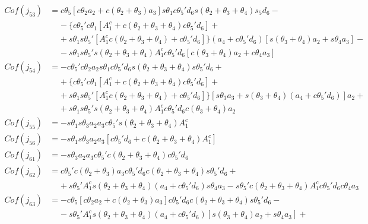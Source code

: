 \begin{align}
    Cof(j_{53}) &= c\theta_5[c\theta_2a_2+c(\theta_2+\theta_3)a_3]s\theta_1c\theta_5'd_6s(\theta_2+\theta_3+\theta_4)s_5d_6- \nonumber \\
                    & \;\;\;\; -\!\{c\theta_5'c\theta_1[A_1^c+c(\theta_2+\theta_3+\theta_4)c\theta_5'd_6]+\nonumber \\
                    & \;\;\;\; +\!s\theta_1s\theta_5'[A_1^cc(\theta_2+\theta_3+\theta_4)+c\theta_5'd_6]\}(a_4+c\theta_5'd_6)[s(\theta_3+\theta_4)a_2+s\theta_4a_3]-\nonumber \\
                    & \;\;\;\; -\!s\theta_1s\theta_5's(\theta_2+\theta_3+\theta_4)A_1^cc\theta_5'd_6[c(\theta_3+\theta_4)a_2+c\theta_4a_3] \nonumber \\        
    Cof(j_{54}) &= -c\theta_5'c\theta_2a_2s\theta_1c\theta_5'd_6s(\theta_2+\theta_3+\theta_4)s\theta_5'd_6+ \nonumber \\
                    & \;\;\;\; +\!\{c\theta_5'c\theta_1[A_1^c+c(\theta_2+\theta_3+\theta_4)c\theta_5'd_6]+\nonumber \\
                    & \;\;\;\; +\!s\theta_1s\theta_5'[A_1^cc(\theta_2+\theta_3+\theta_4)+c\theta_5'd_6]\}[s\theta_3a_3+s(\theta_3+\theta_4)(a_4+c\theta_5'd_6)]a_2+\nonumber \\
                    & \;\;\;\; +\!s\theta_1s\theta_5's(\theta_2+\theta_3+\theta_4)A_1^cc\theta_5'd_6c(\theta_3+\theta_4)a_2 \nonumber \\   
    Cof(j_{55}) &= -s\theta_1s\theta_3a_2a_3c\theta_5's(\theta_2+\theta_3+\theta_4)A_1^c \nonumber \\
    Cof(j_{56}) &= -s\theta_1s\theta_3a_2a_3[c\theta_5'd_6+c(\theta_2+\theta_3+\theta_4)A_1^c] \nonumber \\    
    Cof(j_{61}) &= -s\theta_3a_2a_3c\theta_5'c(\theta_2+\theta_3+\theta_4)c\theta_5'd_6 \nonumber \\
    Cof(j_{62}) &= c\theta_5'c(\theta_2+\theta_3)a_3c\theta_5'd_6c(\theta_2+\theta_3+\theta_4)s\theta_5'd_6+ \nonumber \\
                    & \;\;\;\; +\!s\theta_5'A_1^cs(\theta_2+\theta_3+\theta_4)(a_4+c\theta_5'd_6)s\theta_4a_3 - s\theta_5'c(\theta_2+\theta_3+\theta_4)A_1^cc\theta_5'd_6c\theta_4a_3 \nonumber \\
    Cof(j_{63}) &= -c\theta_5[c\theta_2a_2+c(\theta_2+\theta_3)a_3]c\theta_5'd_6c(\theta_2+\theta_3+\theta_4)s\theta_5'd_6- \nonumber \\
                    & \;\;\;\; -\!s\theta_5'A_1^cs(\theta_2+\theta_3+\theta_4)(a_4+c\theta_5'd_6)[s(\theta_3+\theta_4)a_2+s\theta_4a_3] + \nonumber \\

\end{align}
